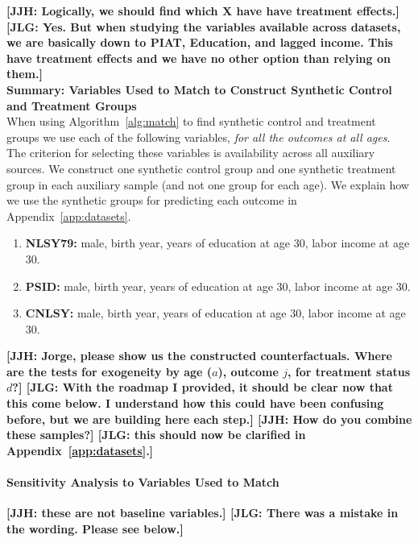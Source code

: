 \noindent \textbf{[JJH: Logically, we should find which X have have treatment effects.] [JLG: Yes. But when studying the variables available across datasets, we are basically down to PIAT, Education, and lagged income. This have treatment effects and we have no other option than relying on them.]}\\

\noindent \textbf{Summary: Variables Used to Match to Construct Synthetic Control and Treatment Groups}\\
When using Algorithm~\ref{alg:match} to find synthetic control and treatment groups we use each of the following variables, \textit{for all the outcomes at all ages}. The criterion for selecting these variables is availability across all auxiliary sources. We construct one synthetic control group and one synthetic treatment group in each auxiliary sample (and not one group for each age). We explain how we use the synthetic groups for predicting each outcome in Appendix~\ref{app:datasets}.
\begin{enumerate}
\item \textbf{NLSY79:} male, birth year, years of education at age 30, labor income at age 30. 
\item \textbf{PSID:} male, birth year, years of education at age 30, labor income at age 30.
\item \textbf{CNLSY:} male, birth year, years of education at age 30, labor income at age 30.
\end{enumerate}

\textbf{[JJH: Jorge, please show us the constructed counterfactuals. Where are the tests for exogeneity by age ($a$), outcome $j$, for treatment status $d$?] [JLG: With the roadmap I provided, it should be clear now that this come below. I understand how this could have been confusing before, but we are building here each step.] [JJH: How do you combine these samples?] [JLG: this should now be clarified in Appendix~\ref{app:datasets}.]}

\paragraph{Sensitivity Analysis to Variables Used to Match}

\noindent \textbf{[JJH: these are not baseline variables.] [JLG: There was a mistake in the wording. Please see below.]}


